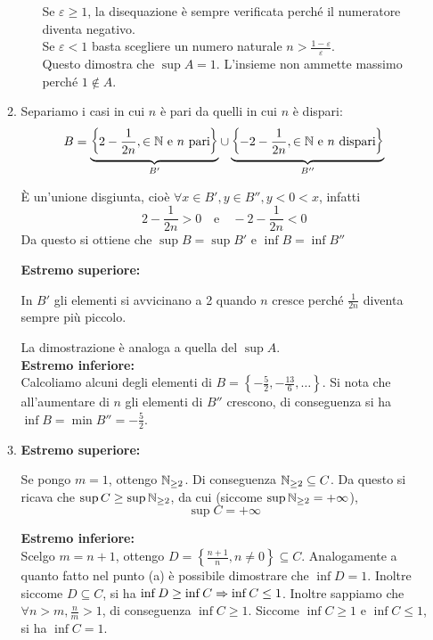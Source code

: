 \documentclass{article}
\begin{document}
\begin{enumerate}[label=\textbf{Esercizio 3.\arabic*.},itemindent=*]
\begin{enumerate}
\begin{itemize}
            Se $\varepsilon \geq 1$, la disequazione è sempre verificata perché il numeratore diventa negativo. \\Se $\varepsilon<1$ basta scegliere un numero naturale $n>\frac{1-\varepsilon}{\varepsilon}$.\\Questo dimostra che $\sup A=1$. L'insieme non ammette massimo perché $1\notin A$.
        \end{itemize}
        \item Separiamo i casi in cui $n$ è pari da quelli in cui $n$ è dispari:
        \[B=\underbrace{\left\{2-\frac{1}{2n}, \in \mathbb{N} \text{ e }n\text{ pari}\right\}}_{B'}\cup\underbrace{\left\{-2-\frac{1}{2n}, \in \mathbb{N} \text{ e }n\text{ dispari}\right\}}_{B''}\]
        \begin{oss}
            È un'unione disgiunta, cioè $\forall x \in B', y\in B'', y<0<x$, infatti 
                \[2-\frac{1}{2n}>0\text{~~ e ~~}-2-\frac{1}{2n}<0\]
            Da questo si ottiene che $\sup B=\sup B'$ e $\inf B=\inf B''$     
        \end{oss}
        \textbf{Estremo superiore:}
        \begin{oss}
            In $B'$ gli elementi si avvicinano a 2 quando $n$ cresce perché $\frac{1}{2n}$ diventa sempre più piccolo. 
        \end{oss}
        La dimostrazione è analoga a quella del $\sup A$.\\
        \textbf{Estremo inferiore:}\\
        Calcoliamo alcuni degli elementi di $B=\left\{-\frac{5}{2},-\frac{13}{6},\dots\right\}$. Si nota che all'aumentare di $n$ gli elementi di $B''$ crescono, di conseguenza si ha $\inf B=\min B''= -\frac{5}{2}$.
        \item \textbf{Estremo superiore:}
        \begin{oss}
            Se pongo $m=1$, ottengo $\mathbb{N}_{\geq2}$. Di conseguenza $\mathbb{N}_{\geq2}\subseteq C$. Da questo si ricava che $\sup C\geq \sup \mathbb{N}_{\geq 2}$, da cui (siccome $\sup \mathbb{N}_{\geq 2}=+\infty$), \[\sup C=+\infty\]
        \end{oss}
        \textbf{Estremo inferiore:}\\
        Scelgo $m=n+1$, ottengo $D=\left\{\frac{n+1}{n}, n\neq 0\right\}\subseteq C$. Analogamente a quanto fatto nel punto (a) è possibile dimostrare che $\inf D=1$. Inoltre siccome $D\subseteq C$, si ha $\inf D\geq \inf C\Rightarrow \inf C\leq 1$. Inoltre sappiamo che $\forall n> m, \frac{n}{m}>1$, di conseguenza $\inf C\geq 1$. Siccome $\inf C\geq 1$ e $\inf C \leq 1$, si ha $\inf C=1$.
    \end{enumerate}
    

\end{enumerate}
\end{document}
